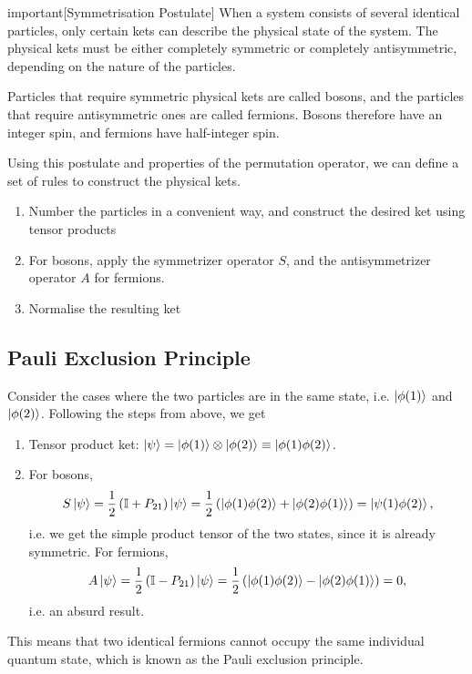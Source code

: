 \documentclass{article}
\begin{document}
\begin{callout*}{important}[Symmetrisation Postulate]
\label{important:postulate-7}
When a system consists of several identical particles, only certain kets can describe the physical state of the system. The physical kets must be either completely symmetric or completely antisymmetric, depending on the nature of the particles.
\end{callout*}

Particles that require symmetric physical kets are called bosons, and the particles that require antisymmetric ones are called fermions. Bosons therefore have an integer spin, and fermions have half-integer spin.

Using this postulate and properties of the permutation operator, we can define a set of rules to construct the physical kets.
\begin{enumerate}
    \item Number the particles in a convenient way, and construct the desired ket using tensor products
    \item For bosons, apply the symmetrizer operator $S$, and the antisymmetrizer operator $A$ for fermions.
    \item Normalise the resulting ket
\end{enumerate}

\subsection{Pauli Exclusion Principle}
Consider the cases where the two particles are in the same state, i.e. $\ket{\phi (1)}$ and $\ket{\phi (2)}$. Following the steps from above, we get
\begin{enumerate}
    \item Tensor product ket: $\ket{\psi }=\ket{\phi (1)}\otimes \ket{\phi (2)}\equiv \ket{\phi (1)\phi (2)}$.
    \item For bosons, 
    \[
        S \ket{\psi }=\frac{1}{2}\left( \mathbb{I}+P_{21} \right)\ket{\psi }=\frac{1}{2}\left( \ket{\phi (1)\phi (2)}+\ket{\phi (2)\phi (1)} \right)=\ket{\psi (1)\phi (2)},
    \]
    i.e. we get the simple product tensor of the two states, since it is already symmetric. For fermions,
    \[
        A \ket{\psi }=\frac{1}{2}\left( \mathbb{I}-P_{21} \right)\ket{\psi }=\frac{1}{2}\left( \ket{\phi (1)\phi (2)}-\ket{\phi (2)\phi (1)} \right)=0,
    \]
    i.e. an absurd result.
\end{enumerate}
This means that two identical fermions cannot occupy the same individual quantum state, which is known as the Pauli exclusion principle.
\end{document}
